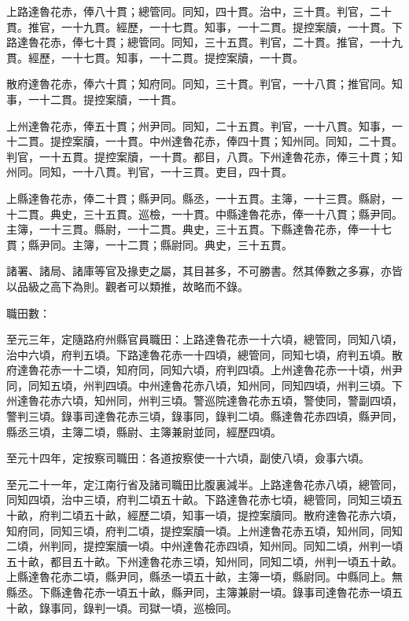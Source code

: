 \begin{pinyinscope}
 上路達魯花赤，俸八十貫；總管同。同知，四十貫。治中，三十貫。判官，二十貫。推官，一十九貫。經歷，一十七貫。知事，一十二貫。提控案牘，一十貫。下路達魯花赤，俸七十貫；總管同。同知，三十五貫。判官，二十貫。推官，一十九貫。經歷，一十七貫。知事，一十二貫。提控案牘，一十貫。



 散府達魯花赤，俸六十貫；知府同。同知，三十貫。判官，一十八貫；推官同。知事，一十二貫。提控案牘，一十貫。



 上州達魯花赤，俸五十貫；州尹同。同知，二十五貫。判官，一十八貫。知事，一十二貫。提控案牘，一十貫。中州達魯花赤，俸四十貫；知州同。同知，二十貫。判官，一十五貫。提控案牘，一十貫。都目，八貫。下州達魯花赤，俸三十貫；知州同。同知，一十八貫。判官，一十三貫。吏目，四十貫。



 上縣達魯花赤，俸二十貫；縣尹同。縣丞，一十五貫。主簿，一十三貫。縣尉，一十二貫。典史，三十五貫。巡檢，一十貫。中縣達魯花赤，俸一十八貫；縣尹同。主簿，一十三貫。縣尉，一十二貫。典史，三十五貫。下縣達魯花赤，俸一十七貫；縣尹同。主簿，一十二貫；縣尉同。典史，三十五貫。



 諸署、諸局、諸庫等官及掾吏之屬，其目甚多，不可勝書。然其俸數之多寡，亦皆以品級之高下為則。觀者可以類推，故略而不錄。



 職田數：



 至元三年，定隨路府州縣官員職田：上路達魯花赤一十六頃，總管同，同知八頃，治中六頃，府判五頃。下路達魯花赤一十四頃，總管同，同知七頃，府判五頃。散府達魯花赤一十二頃，知府同，同知六頃，府判四頃。上州達魯花赤一十頃，州尹同，同知五頃，州判四頃。中州達魯花赤八頃，知州同，同知四頃，州判三頃。下州達魯花赤六頃，知州同，州判三頃。警巡院達魯花赤五頃，警使同，警副四頃，警判三頃。錄事司達魯花赤三頃，錄事同，錄判二頃。縣達魯花赤四頃，縣尹同，縣丞三頃，主簿二頃，縣尉、主簿兼尉並同，經歷四頃。



 至元十四年，定按察司職田：各道按察使一十六頃，副使八頃，僉事六頃。



 至元二十一年，定江南行省及諸司職田比腹裏減半。上路達魯花赤八頃，總管同，同知四頃，治中三頃，府判二頃五十畝。下路達魯花赤七頃，總管同，同知三頃五十畝，府判二頃五十畝，經歷二頃，知事一頃，提控案牘同。散府達魯花赤六頃，知府同，同知三頃，府判二頃，提控案牘一頃。上州達魯花赤五頃，知州同，同知二頃，州判同，提控案牘一頃。中州達魯花赤四頃，知州同。同知二頃，州判一頃五十畝，都目五十畝。下州達魯花赤三頃，知州同，同知二頃，州判一頃五十畝。上縣達魯花赤二頃，縣尹同，縣丞一頃五十畝，主簿一頃，縣尉同。中縣同上。無縣丞。下縣達魯花赤一頃五十畝，縣尹同，主簿兼尉一頃。錄事司達魯花赤一頃五十畝，錄事同，錄判一頃。司獄一頃，巡檢同。




\end{pinyinscope}
